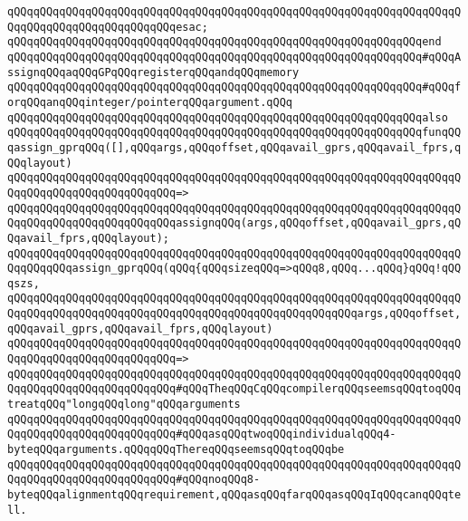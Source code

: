 \verb|qQQqqQQqqQQqqQQqqQQqqQQqqQQqqQQqqQQqqQQqqQQqqQQqqQQqqQQqqQQqqQQqqQQqqQQqqQQqqQQqqQQqqQQqqQQqqQQqesac;|\newline
\newline
\verb|qQQqqQQqqQQqqQQqqQQqqQQqqQQqqQQqqQQqqQQqqQQqqQQqqQQqqQQqqQQqqQQqend|\newline
\newline
\verb|qQQqqQQqqQQqqQQqqQQqqQQqqQQqqQQqqQQqqQQqqQQqqQQqqQQqqQQqqQQqqQQq#qQQqAssignqQQqaqQQqGPqQQqregisterqQQqandqQQqmemory|\newline
\verb|qQQqqQQqqQQqqQQqqQQqqQQqqQQqqQQqqQQqqQQqqQQqqQQqqQQqqQQqqQQqqQQq#qQQqforqQQqanqQQqinteger/pointerqQQqargument.qQQq|\newline
\verb|qQQqqQQqqQQqqQQqqQQqqQQqqQQqqQQqqQQqqQQqqQQqqQQqqQQqqQQqqQQqqQQqalso|\newline
\verb|qQQqqQQqqQQqqQQqqQQqqQQqqQQqqQQqqQQqqQQqqQQqqQQqqQQqqQQqqQQqqQQqfunqQQqassign_gprqQQq([],qQQqargs,qQQqoffset,qQQqavail_gprs,qQQqavail_fprs,qQQqlayout)|\newline
\verb|qQQqqQQqqQQqqQQqqQQqqQQqqQQqqQQqqQQqqQQqqQQqqQQqqQQqqQQqqQQqqQQqqQQqqQQqqQQqqQQqqQQqqQQqqQQqqQQq=>|\newline
\verb|qQQqqQQqqQQqqQQqqQQqqQQqqQQqqQQqqQQqqQQqqQQqqQQqqQQqqQQqqQQqqQQqqQQqqQQqqQQqqQQqqQQqqQQqqQQqqQQqassignqQQq(args,qQQqoffset,qQQqavail_gprs,qQQqavail_fprs,qQQqlayout);|\newline
\newline
\verb|qQQqqQQqqQQqqQQqqQQqqQQqqQQqqQQqqQQqqQQqqQQqqQQqqQQqqQQqqQQqqQQqqQQqqQQqqQQqqQQqassign_gprqQQq(qQQq{qQQqsizeqQQq=>qQQq8,qQQq...qQQq}qQQq!qQQqszs,|\newline
\verb|qQQqqQQqqQQqqQQqqQQqqQQqqQQqqQQqqQQqqQQqqQQqqQQqqQQqqQQqqQQqqQQqqQQqqQQqqQQqqQQqqQQqqQQqqQQqqQQqqQQqqQQqqQQqqQQqqQQqqQQqqQQqargs,qQQqoffset,qQQqavail_gprs,qQQqavail_fprs,qQQqlayout)|\newline
\verb|qQQqqQQqqQQqqQQqqQQqqQQqqQQqqQQqqQQqqQQqqQQqqQQqqQQqqQQqqQQqqQQqqQQqqQQqqQQqqQQqqQQqqQQqqQQqqQQq=>|\newline
\verb|qQQqqQQqqQQqqQQqqQQqqQQqqQQqqQQqqQQqqQQqqQQqqQQqqQQqqQQqqQQqqQQqqQQqqQQqqQQqqQQqqQQqqQQqqQQqqQQq#qQQqTheqQQqCqQQqcompilerqQQqseemsqQQqtoqQQqtreatqQQq"longqQQqlong"qQQqarguments|\newline
\verb|qQQqqQQqqQQqqQQqqQQqqQQqqQQqqQQqqQQqqQQqqQQqqQQqqQQqqQQqqQQqqQQqqQQqqQQqqQQqqQQqqQQqqQQqqQQqqQQq#qQQqasqQQqtwoqQQqindividualqQQq4-byteqQQqarguments.qQQqqQQqThereqQQqseemsqQQqtoqQQqbe|\newline
\verb|qQQqqQQqqQQqqQQqqQQqqQQqqQQqqQQqqQQqqQQqqQQqqQQqqQQqqQQqqQQqqQQqqQQqqQQqqQQqqQQqqQQqqQQqqQQqqQQq#qQQqnoqQQq8-byteqQQqalignmentqQQqrequirement,qQQqasqQQqfarqQQqasqQQqIqQQqcanqQQqtell.|\newline
